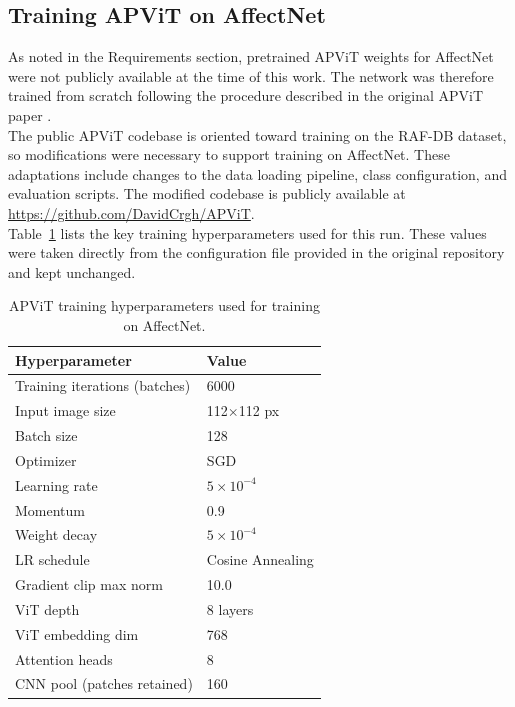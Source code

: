 \subsection{Training APViT on AffectNet}\label{section:design-apvit-training}

As noted in the Requirements section, pretrained APViT weights for AffectNet were not publicly available at the time of this work. The network was therefore trained from scratch following the procedure described in the original APViT paper \cite{apvit2023}.\\

The public APViT codebase is oriented toward training on the RAF-DB dataset, so modifications were necessary to support training on AffectNet. These adaptations include changes to the data loading pipeline, class configuration, and evaluation scripts. The modified codebase is publicly available at \url{https://github.com/DavidCrgh/APViT}.\\

Table~\ref{tab:design-apvit-hyperparams} lists the key training hyperparameters used for this run. These values were taken directly from the configuration file provided in the original repository and kept unchanged.\\

\begin{table}[h]
    \centering
    \caption[APViT training hyperparameters for AffectNet]{APViT training hyperparameters used for training on AffectNet.}
    \label{tab:design-apvit-hyperparams}
    \begin{tabular}{ll}
        \toprule
        \textbf{Hyperparameter} & \textbf{Value} \\
        \midrule
		Training iterations (batches) & 6000 \\
        Input image size       & 112$\times$112 px \\
        Batch size             & 128 \\
        Optimizer              & SGD \\
        Learning rate          & $5 \times 10^{-4}$ \\
        Momentum               & 0.9 \\
        Weight decay           & $5 \times 10^{-4}$ \\
        LR schedule            & Cosine Annealing \\
        Gradient clip max norm & 10.0 \\
        ViT depth              & 8 layers \\
        ViT embedding dim      & 768 \\
        Attention heads        & 8 \\
        CNN pool (patches retained) & 160 \\
        \bottomrule
    \end{tabular}
\end{table}

